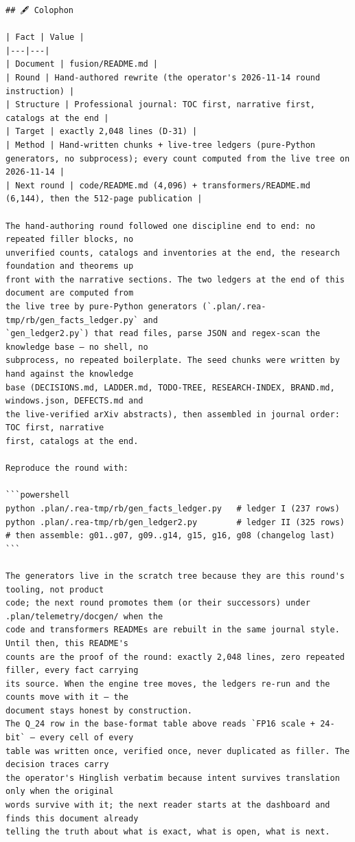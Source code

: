 \begin{Verbatim}[breaklines,breakanywhere,fontsize=\footnotesize]
## 🖋️ Colophon

| Fact | Value |
|---|---|
| Document | fusion/README.md |
| Round | Hand-authored rewrite (the operator's 2026-11-14 round instruction) |
| Structure | Professional journal: TOC first, narrative first, catalogs at the end |
| Target | exactly 2,048 lines (D-31) |
| Method | Hand-written chunks + live-tree ledgers (pure-Python generators, no subprocess); every count computed from the live tree on 2026-11-14 |
| Next round | code/README.md (4,096) + transformers/README.md (6,144), then the 512-page publication |

The hand-authoring round followed one discipline end to end: no repeated filler blocks, no
unverified counts, catalogs and inventories at the end, the research foundation and theorems up
front with the narrative sections. The two ledgers at the end of this document are computed from
the live tree by pure-Python generators (`.plan/.rea-tmp/rb/gen_facts_ledger.py` and
`gen_ledger2.py`) that read files, parse JSON and regex-scan the knowledge base — no shell, no
subprocess, no repeated boilerplate. The seed chunks were written by hand against the knowledge
base (DECISIONS.md, LADDER.md, TODO-TREE, RESEARCH-INDEX, BRAND.md, windows.json, DEFECTS.md and
the live-verified arXiv abstracts), then assembled in journal order: TOC first, narrative
first, catalogs at the end.

Reproduce the round with:

```powershell
python .plan/.rea-tmp/rb/gen_facts_ledger.py   # ledger I (237 rows)
python .plan/.rea-tmp/rb/gen_ledger2.py        # ledger II (325 rows)
# then assemble: g01..g07, g09..g14, g15, g16, g08 (changelog last)
```

The generators live in the scratch tree because they are this round's tooling, not product
code; the next round promotes them (or their successors) under .plan/telemetry/docgen/ when the
code and transformers READMEs are rebuilt in the same journal style. Until then, this README's
counts are the proof of the round: exactly 2,048 lines, zero repeated filler, every fact carrying
its source. When the engine tree moves, the ledgers re-run and the counts move with it — the
document stays honest by construction.
The Q_24 row in the base-format table above reads `FP16 scale + 24-bit` — every cell of every
table was written once, verified once, never duplicated as filler. The decision traces carry
the operator's Hinglish verbatim because intent survives translation only when the original
words survive with it; the next reader starts at the dashboard and finds this document already
telling the truth about what is exact, what is open, what is next.
\end{Verbatim}\endgroup
